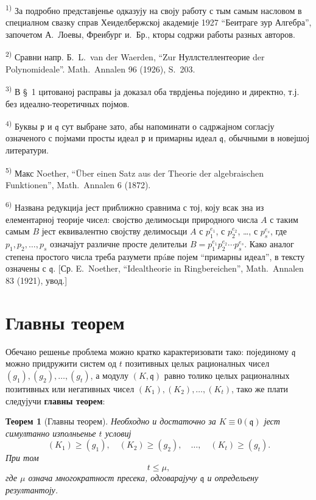 \documentclass[11pt]{article}
\newcommand{\foreign}[1]{#1}
\theoremstyle{plain}
\newtheorem{satz}{Теорем}
\begin{document}
{\footnotesize
\textsuperscript{1)} За подробно представјенье одказују на своју работу с тым самым
насловом в специалном свазку справ Хеиделбержској академије 1927
``Беитраге зур Алгебра'', започетом А.\ Лоевы, Фреибург и.\ Бр., кторы
содржи работы разных авторов.

\textsuperscript{2)} Сравни напр. Б.\ L.\ van der Waerden, ``Zur Нуллстеллентеорие der Polynomideale''.
\foreign{Math.\ Annalen} 96 (1926), S.~203.

\textsuperscript{3)} В \S~1 цитованој расправы ја доказал оба тврдјеньа поједино и директно,
т.ј. без идеално-теоретичных појмов.

\textsuperscript{4)} Буквы $\mathfrak{p}$ и $\mathfrak{q}$ сут выбране зато, абы напоминати
о садржајном согласју означеного с појмами просты идеал
$\mathfrak{p}$ и примарны идеал $\mathfrak{q}$, обычными в новејшој литератури.

\textsuperscript{5)} Макс Noether, ``Über einen Satz aus der Theorie der algebraischen Funktionen'',
\foreign{Math.\ Annalen} 6 (1872).

\textsuperscript{6)} Названа редукција јест приближно сравнима с тој, коју всак зна из
елементарној теорије чисел: својство делимосьци природного числа
$A$ с таким самым $B$ јест еквивалентно својству делимосьци $A$ с
$p_{1}^{e_{1}}$, с $p_{2}^{e_{2}}$, \ldots, с $p_{s}^{e_{s}}$, где
$p_{1}, p_{2}, \ldots, p_{s}$ означајут различне просте делительи
$B = p_{1}^{e_{1}}p_{2}^{e_{2}} \cdots p_{s}^{e_{s}}$. Како аналог
степена простого числа треба разумети прáве појем ``примарны идеал'',
в тексту означены с $\mathfrak{q}$. [Ср. E.\ Noether,
``Idealtheorie in Ringbereichen'', \foreign{Math.\ Annalen} 83 (1921), увод.]
}

\newpage
\section*{Главны теорем}

Обечано решенье проблема можно кратко карактеризовати тако:
појединому $\mathfrak{q}$ можно придружити систем од $t$ позитивных
целых рационалных чисел $(g_{1}), (g_{2}), \ldots, (g_{t})$, а
модулу $(K, \mathfrak{q})$ равно толико целых рационалных позитивных
или негативных чисел $(K_{1}), (K_{2}), \ldots, (K_{t})$, тако же
плати следујучи \textbf{главны теорем}:

\begin{satz}[Главны теорем]\label{satz:kap-II}
Необходно и достаточно за $K \equiv 0(\mathfrak{q})$ јест
симултанно изполньенье $t$ условиј
\[
(K_{1}) \geq (g_{1}), \quad (K_{2}) \geq (g_{2}), \quad\ldots,\quad (K_{t}) \geq (g_{t}).
\]
При том
\[
t \leq \mu,
\]
где $\mu$ означа многократност пресека, одговарајучу
$\mathfrak{q}$ и определьену резултантоју.
\end{satz}
\end{document}
